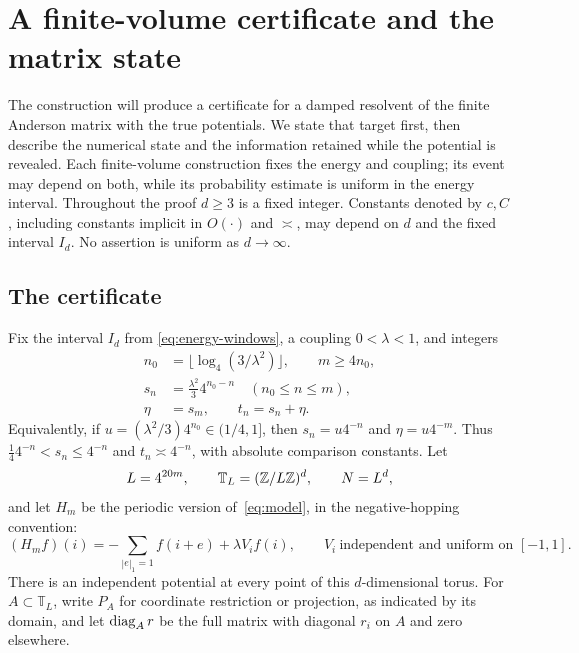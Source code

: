 \section{A finite-volume certificate and the matrix state}\label{sec:state}

The construction will produce a certificate for a damped resolvent of
the finite Anderson matrix with the true potentials. We state that target first, then describe
the numerical state and the information retained while the potential is
revealed. Each finite-volume construction fixes the energy and coupling;
its event may depend on both, while its probability estimate is uniform
in the energy interval. Throughout the proof $d\ge3$ is a fixed integer. Constants
denoted by $c,C$, including constants implicit in $O(\cdot)$ and
$\asymp$, may depend on $d$ and the fixed interval $I_d$. No assertion is uniform as $d\to\infty$.

\subsection{The certificate}

Fix the interval $I_d$ from \eqref{eq:energy-windows},
a coupling $0<\lambda<1$, and integers
\begin{equation}\label{eq:scales}
 \begin{aligned}
 n_0&=\lfloor\log_4(3/\lambda^2)\rfloor,\qquad m\ge4n_0,\\
 s_n&=\frac{\lambda^2}{3}4^{n_0-n}\quad(n_0\le n\le m),\\
 \eta&=s_m,\qquad t_n=s_n+\eta.
 \end{aligned}
\end{equation}
Equivalently, if $u=(\lambda^2/3)4^{n_0}\in(1/4,1]$, then
$s_n=u4^{-n}$ and $\eta=u4^{-m}$. Thus
$\frac14 4^{-n}<s_n\le4^{-n}$ and $t_n\asymp4^{-n}$, with
absolute comparison constants. Let
\[
 L=4^{20m},\qquad \mathbb T_L=(\mathbb Z/L\mathbb Z)^d,\qquad N=L^d,
\]
and let $H_m$ be the periodic version of~\eqref{eq:model}, in the
negative-hopping convention:
\[
 (H_m f)(i)=-\sum_{|e|_1=1}f(i+e)+\lambda V_i f(i),
 \qquad V_i\ \text{independent and uniform on }[-1,1].
\]
There is an independent potential at every point of this
$d$-dimensional torus.
For $A\subset\mathbb T_L$, write $P_A$ for coordinate restriction or
projection, as indicated by its domain, and let $\operatorname{diag}_A r$ be the
full matrix with diagonal $r_i$ on $A$ and zero elsewhere.

